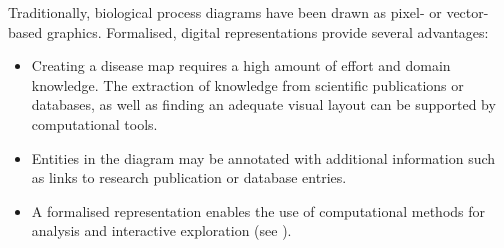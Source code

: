 \documentclass[
	fontsize=10pt, %
	twoside=false, %
	secnumdepth=1, %
  toc=indentunnumbered %
]{kaobook}
\begin{document}
Traditionally, biological process diagrams have been drawn as pixel- or
vector-based graphics. Formalised, digital representations provide several
advantages:
\begin{itemize}
\item Creating a disease map requires a high amount of effort and domain
  knowledge. The extraction of knowledge from scientific publications or
  databases, as well as finding an adequate visual layout can be supported by
  computational tools.
\item Entities in the diagram may be annotated with additional information
  such as links to research publication or database entries.
\item A formalised representation enables the use of computational methods for
  analysis and interactive exploration (see ).
\end{itemize}
\end{document}
